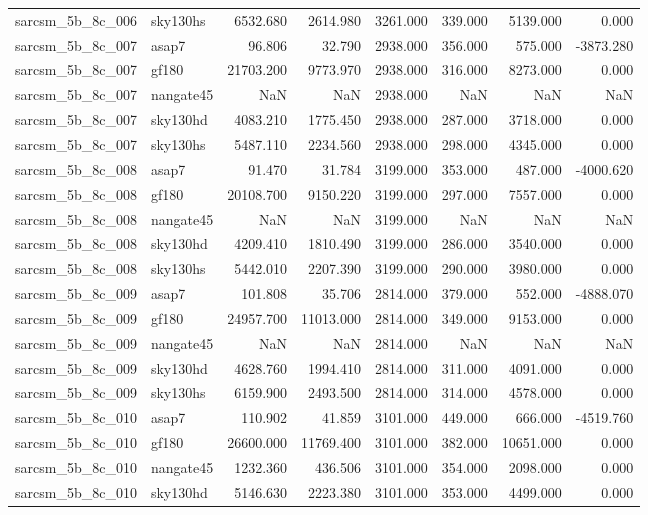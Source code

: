 \begin{tabular}{llrrrrrr}
sarcsm\_5b\_8c\_006 & sky130hs & 6532.680 & 2614.980 & 3261.000 & 339.000 & 5139.000 & 0.000 \\
sarcsm\_5b\_8c\_007 & asap7 & 96.806 & 32.790 & 2938.000 & 356.000 & 575.000 & -3873.280 \\
sarcsm\_5b\_8c\_007 & gf180 & 21703.200 & 9773.970 & 2938.000 & 316.000 & 8273.000 & 0.000 \\
sarcsm\_5b\_8c\_007 & nangate45 & NaN & NaN & 2938.000 & NaN & NaN & NaN \\
sarcsm\_5b\_8c\_007 & sky130hd & 4083.210 & 1775.450 & 2938.000 & 287.000 & 3718.000 & 0.000 \\
sarcsm\_5b\_8c\_007 & sky130hs & 5487.110 & 2234.560 & 2938.000 & 298.000 & 4345.000 & 0.000 \\
sarcsm\_5b\_8c\_008 & asap7 & 91.470 & 31.784 & 3199.000 & 353.000 & 487.000 & -4000.620 \\
sarcsm\_5b\_8c\_008 & gf180 & 20108.700 & 9150.220 & 3199.000 & 297.000 & 7557.000 & 0.000 \\
sarcsm\_5b\_8c\_008 & nangate45 & NaN & NaN & 3199.000 & NaN & NaN & NaN \\
sarcsm\_5b\_8c\_008 & sky130hd & 4209.410 & 1810.490 & 3199.000 & 286.000 & 3540.000 & 0.000 \\
sarcsm\_5b\_8c\_008 & sky130hs & 5442.010 & 2207.390 & 3199.000 & 290.000 & 3980.000 & 0.000 \\
sarcsm\_5b\_8c\_009 & asap7 & 101.808 & 35.706 & 2814.000 & 379.000 & 552.000 & -4888.070 \\
sarcsm\_5b\_8c\_009 & gf180 & 24957.700 & 11013.000 & 2814.000 & 349.000 & 9153.000 & 0.000 \\
sarcsm\_5b\_8c\_009 & nangate45 & NaN & NaN & 2814.000 & NaN & NaN & NaN \\
sarcsm\_5b\_8c\_009 & sky130hd & 4628.760 & 1994.410 & 2814.000 & 311.000 & 4091.000 & 0.000 \\
sarcsm\_5b\_8c\_009 & sky130hs & 6159.900 & 2493.500 & 2814.000 & 314.000 & 4578.000 & 0.000 \\
sarcsm\_5b\_8c\_010 & asap7 & 110.902 & 41.859 & 3101.000 & 449.000 & 666.000 & -4519.760 \\
sarcsm\_5b\_8c\_010 & gf180 & 26600.000 & 11769.400 & 3101.000 & 382.000 & 10651.000 & 0.000 \\
sarcsm\_5b\_8c\_010 & nangate45 & 1232.360 & 436.506 & 3101.000 & 354.000 & 2098.000 & 0.000 \\
sarcsm\_5b\_8c\_010 & sky130hd & 5146.630 & 2223.380 & 3101.000 & 353.000 & 4499.000 & 0.000 \\

\end{tabular}
